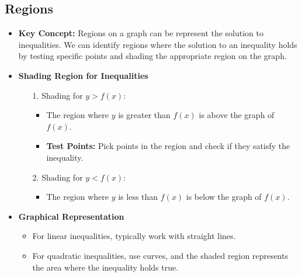 
\subsection{Regions}
\begin{itemize}
    \item \textbf{Key Concept:} Regions on a graph can be represent the solution to inequalities. We can identify regions where
    the solution to an inequality holds by testing specific points and shading the appropriate region on the graph.
    \item \textbf{Shading Region for Inequalities}
    \begin{itemize}
        \item[1.] Shading for $y > f(x)$:
        \begin{itemize}
            \item The region where $y$ is greater than $f(x)$ is above the graph of $f(x)$.
            \item \textbf{Test Points:} Pick points in the region and check if they satisfy the inequality.
        \end{itemize}
        \item[2.] Shading for $y < f(x)$:
        \begin{itemize}
            \item The region where $y$ is less than $f(x)$ is below the graph of $f(x)$.
        \end{itemize}
    \end{itemize}
    \item \textbf{Graphical Representation}
    \begin{itemize}
        \item For linear inequalities, typically work with straight lines.
        \item For quadratic inequalities, use curves, and the shaded region represents the area where the inequality holds true.
    \end{itemize}
\end{itemize}